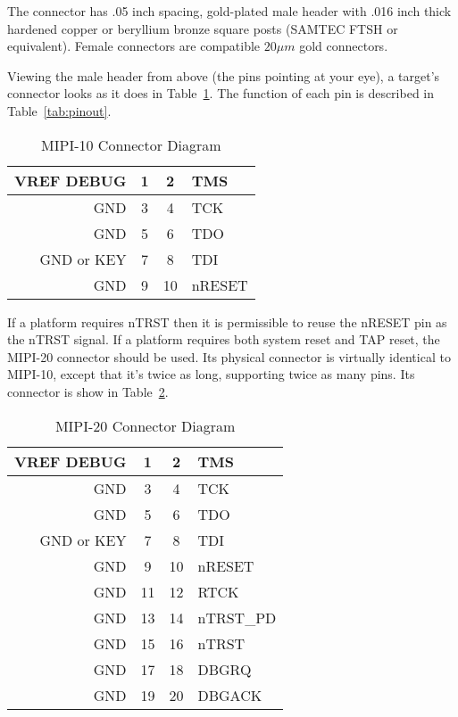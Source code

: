 The connector has .05 inch spacing, gold-plated male header with .016 inch thick
hardened copper or beryllium bronze square posts (SAMTEC FTSH or equivalent).
Female connectors are compatible $20\mu m$ gold connectors.

Viewing the male header from above (the pins pointing at your eye), a target's
connector looks as it does in Table~\ref{tab:mipiten}.  The function of each pin
is described in Table~\ref{tab:pinout}.

\begin{table}[htp]
    \centering
    \caption{MIPI-10 Connector Diagram}
    \label{tab:mipiten}
    \begin{tabular}{|r|c|c|l|}
        \hline
        VREF DEBUG & 1 & 2 & TMS \\
        \hline
        GND & 3 & 4 & TCK \\
        \hline
        GND & 5 & 6 & TDO \\
        \hline
        GND or KEY & 7 & 8 & TDI \\
        \hline
        GND & 9 & 10 & nRESET \\
        \hline
    \end{tabular}
\end{table}

If a platform requires nTRST then it is permissible to reuse the nRESET pin as
the nTRST signal.  If a platform requires both system reset and TAP reset, the
MIPI-20 connector should be used. Its physical connector is virtually identical
to MIPI-10, except that it's twice as long, supporting twice as many pins. Its
connector is show in Table~\ref{tab:mipitwenty}.

\begin{table}[htp]
    \centering
    \caption{MIPI-20 Connector Diagram}
    \label{tab:mipitwenty}
    \begin{tabular}{|r|c|c|l|}
        \hline
        VREF DEBUG & 1 & 2 & TMS \\
        \hline
        GND & 3 & 4 & TCK \\
        \hline
        GND & 5 & 6 & TDO \\
        \hline
        GND or KEY & 7 & 8 & TDI \\
        \hline
        GND & 9 & 10 & nRESET \\
        \hline
        GND & 11 & 12 & RTCK \\
        \hline
        GND & 13 & 14 & nTRST\_PD \\
        \hline
        GND & 15 & 16 & nTRST \\
        \hline
        GND & 17 & 18 & DBGRQ \\
        \hline
        GND & 19 & 20 & DBGACK \\
        \hline
    \end{tabular}
\end{table}

